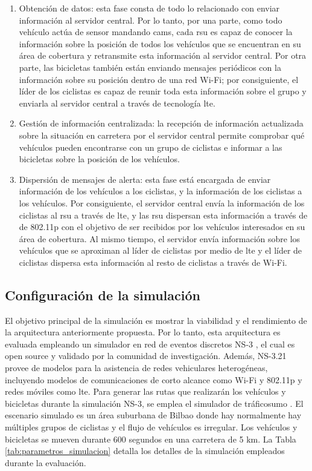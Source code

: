\begin{enumerate}
	\item Obtención de datos: esta fase consta de todo lo relacionado con enviar
	información al servidor central. Por lo tanto, por una parte, como todo
	vehículo actúa de sensor mandando \gls{cam}s, cada \gls{rsu} es capaz de
	conocer la información sobre la posición de todos los vehículos que se
	encuentran en su área de cobertura y retransmite esta información al
	servidor central. Por otra parte, las bicicletas también están enviando
	mensajes periódicos con la información sobre su posición dentro de una red
	Wi-Fi; por consiguiente, el líder de los ciclistas es capaz de reunir toda
	esta información sobre el grupo y enviarla al servidor central a través de
	tecnología \gls{lte}.

	\item Gestión de información centralizada: la recepción de información
	actualizada sobre la situación en carretera por el servidor central permite
	comprobar qué vehículos pueden encontrarse con un grupo de ciclistas e
	informar a las bicicletas sobre la posición de los vehículos.

	\item Dispersión de mensajes de alerta: esta fase está encargada de enviar
	información de los vehículos a los ciclistas, y la información de los
	ciclistas a los vehículos. Por consiguiente, el servidor central envía la
	información de los ciclistas al \gls{rsu} a través de \gls{lte}, y las
	\gls{rsu} dispersan esta información a través de de \gls{802.11p} con el
	objetivo de ser recibidos por los vehículos interesados en su área de
	cobertura. Al mismo tiempo, el servidor envía información sobre los vehículos
	que se aproximan al líder de ciclistas por medio de \gls{lte} y el líder de
	ciclistas dispersa esta información al resto de ciclistas a través de Wi-Fi.
\end{enumerate}

\subsection{Configuración de la simulación}
El objetivo principal de la simulación es mostrar la viabilidad y el
rendimiento de la arquitectura anteriormente propuesta. Por lo tanto, esta
arquitectura es evaluada empleando un simulador en red de eventos discretos
NS-3 \cite{16}, el cual es open source y validado por la comunidad de
investigación. Además, NS-3.21 provee de modelos para la asistencia de redes
vehiculares heterogéneas, incluyendo modelos de comunicaciones de corto alcance
como Wi-Fi y \gls{802.11p} y redes móviles como \gls{lte}. Para generar las
rutas que realizarán los vehículos y bicicletas durante la simulación NS-3,
se emplea el simulador de tráfico\gls{sumo} \cite{17}. El escenario simulado es
un área suburbana de Bilbao donde hay normalmente hay múltiples grupos de
ciclistas y el flujo de vehículos es irregular. Los vehículos y bicicletas se
mueven durante 600 segundos en una carretera de 5 km. La Tabla
\ref{tab:parametros_simulacion} detalla los detalles de la simulación empleados
durante la evaluación.

